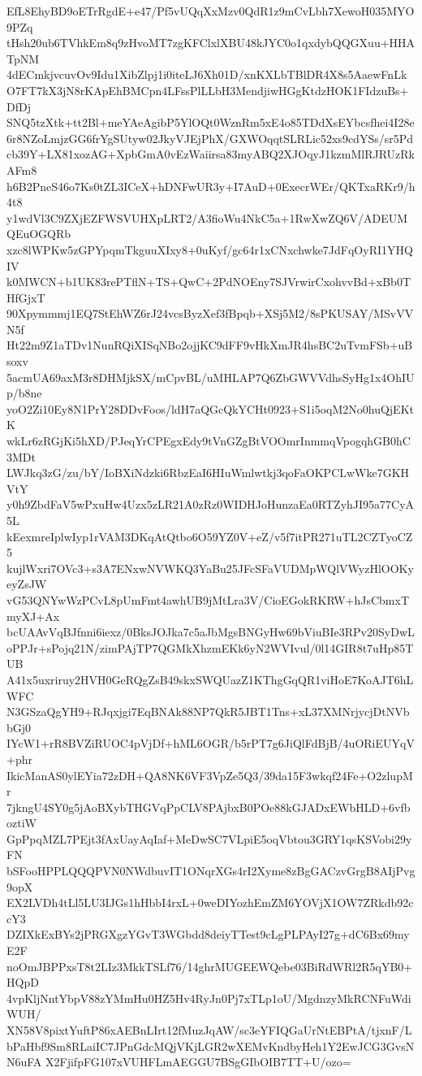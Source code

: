 EfL8EhyBD9oETrRgdE+e47/Pf5vUQqXxMzv0QdR1z9mCvLbh7XewoH035MYO9PZq
tHsh20ub6TVhkEm8q9zHvoMT7zgKFClxlXBU48kJYC0o1qxdybQQGXuu+HHATpNM
4dECmkjvcuvOv9Idu1XibZlpj1i0iteLJ6Xh01D/xnKXLbTBlDR4X8s5AaewFnLk
O7FT7kX3jN8rKApEhBMCpn4LFssPlLLbH3MendjiwHGgKtdzHOK1FIdzuBs+DfDj
SNQ5tzXtk+tt2Bl+meYAeAgibP5YlOQt0WznRm5xE4o85TDdXsEYbcsfhei4I28e
6r8NZoLmjzGG6frYgSUtyw02JkyVJEjPhX/GXWOqqtSLRLic52xs9cdYSs/sr5Pd
cb39Y+LX81xozAG+XpbGmA0vEzWaiirsa83myABQ2XJOqyJ1kzmMlRJRUzRkAFm8
h6B2PneS46o7Ks0tZL3ICeX+hDNFwUR3y+I7AuD+0ExecrWEr/QKTxaRKr9/h4t8
y1wdVl3C9ZXjEZFWSVUHXpLRT2/A3fioWu4NkC5a+1RwXwZQ6V/ADEUMQEuOGQRb
xzc8lWPKw5zGPYpqmTkguuXIxy8+0uKyf/gc64r1xCNxchwke7JdFqOyRI1YHQIV
k0MWCN+b1UK83rePTflN+TS+QwC+2PdNOEny7SJVrwirCxohvvBd+xBb0THfGjxT
90Xpymmmj1EQ7StEhWZ6rJ24vcsByzXef3fBpqb+XSj5M2/8sPKUSAY/MSvVVN5f
Ht22m9Z1aTDv1NunRQiXISqNBo2ojjKC9dFF9vHkXmJR4hsBC2uTvmFSb+uBsoxv
5acmUA69axM3r8DHMjkSX/mCpvBL/uMHLAP7Q6ZbGWVVdhsSyHg1x4OhIUp/b8ne
yoO2Zi10Ey8N1PrY28DDvFoos/ldH7aQGcQkYCHt0923+S1i5oqM2No0huQjEKtK
wkLr6zRGjKi5hXD/PJeqYrCPEgxEdy9tVnGZgBtVOOmrInmmqVpogqhGB0hC3MDt
LWJkq3zG/zu/bY/IoBXiNdzki6RbzEaI6HIuWmlwtkj3qoFaOKPCLwWke7GKHVtY
y0h9ZbdFaV5wPxuHw4Uzx5zLR21A0zRz0WIDHJoHunzaEa0RTZyhJI95a77CyA5L
kEexmreIplwIyp1rVAM3DKqAtQtbo6O59YZ0V+eZ/v5f7itPR271uTL2CZTyoCZ5
kujlWxri7OVc3+s3A7ENxwNVWKQ3YaBu25JFcSFaVUDMpWQlVWyzHlOOKyeyZsJW
vG53QNYwWzPCvL8pUmFmt4awhUB9jMtLra3V/CioEGokRKRW+hJsCbmxTmyXJ+Ax
bcUAAvVqBJfnni6iexz/0BksJOJka7c5aJbMgsBNGyHw69bViuBIe3RPv20SyDwL
oPPJr+sPojq21N/zimPAjTP7QGMkXhzmEKk6yN2WVIvul/0l14GIR8t7uHp85TUB
A41x5uxriruy2HVH0GeRQgZsB49skxSWQUazZ1KThgGqQR1viHoE7KoAJT6hLWFC
N3GSzaQgYH9+RJqxjgi7EqBNAk88NP7QkR5JBT1Tns+xL37XMNrjycjDtNVbbGj0
IYcW1+rR8BVZiRUOC4pVjDf+hML6OGR/b5rPT7g6JiQlFdBjB/4uORiEUYqV+phr
IkicManAS0ylEYia72zDH+QA8NK6VF3VpZe5Q3/39da15F3wkqf24Fe+O2zlupMr
7jkngU4SY0g5jAoBXybTHGVqPpCLV8PAjbxB0POe88kGJADxEWbHLD+6vfboztiW
GpPpqMZL7PEjt3fAxUayAqIaf+MeDwSC7VLpiE5oqVbtou3GRY1qsKSVobi29yFN
bSFooHPPLQQQPVN0NWdbuvIT1ONqrXGs4rI2Xyme8zBgGACzvGrgB8AIjPvg9opX
EX2LVDh4tLl5LU3IJGs1hHbbI4rxL+0weDIYozhEmZM6YOVjX1OW7ZRkdb92ccY3
DZIXkExBYs2jPRGXgzYGvT3WGbdd8deiyTTest9cLgPLPAyI27g+dC6Bx69myE2F
noOmJBPPxsT8t2LIz3MkkTSLf76/14ghrMUGEEWQebe03BiRdWRl2R5qYB0+HQpD
4vpKljNntYbpV88zYMmHu0HZ5Hv4RyJn0Pj7xTLp1oU/MgdnzyMkRCNFuWdiWUH/
XN58V8pixtYuftP86xAEBnLIrt12fMuzJqAW/sc3eYFIQGaUrNtEBPtA/tjxnF/L
bPaHbf9Sm8RLaiIC7JPnGdcMQjVKjLGR2wXEMvKndbyHeh1Y2EwJCG3GvsNN6uFA
X2FjifpFG107xVUHFLmAEGGU7BSgGIbOIB7TT+U/ozo=
